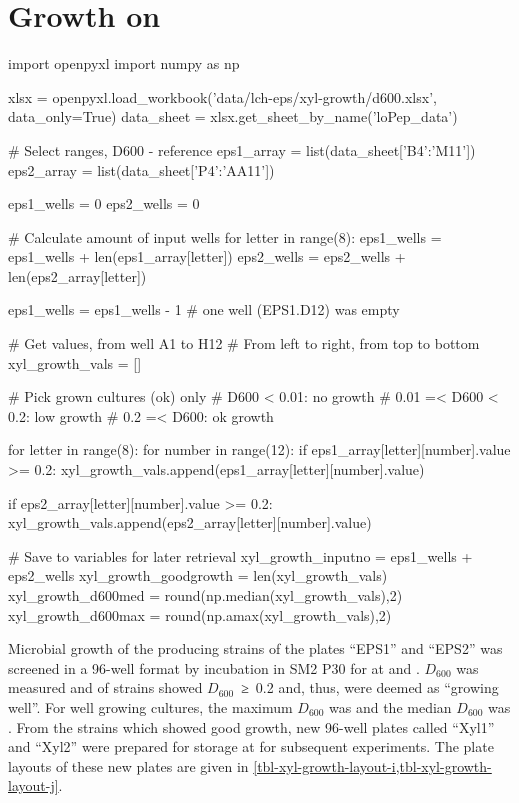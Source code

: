 \section{Growth on \XYL{}\label{sec-xyl-growth}}
\begin{pycode}
import openpyxl
import numpy as np

xlsx = openpyxl.load_workbook('data/lch-eps/xyl-growth/d600.xlsx', data_only=True)
data_sheet = xlsx.get_sheet_by_name('loPep_data')

# Select ranges, D600 - reference
eps1_array = list(data_sheet['B4':'M11'])
eps2_array = list(data_sheet['P4':'AA11'])

eps1_wells = 0
eps2_wells = 0

# Calculate amount of input wells
for letter in range(8):
    eps1_wells = eps1_wells + len(eps1_array[letter])
    eps2_wells = eps2_wells + len(eps2_array[letter])

eps1_wells = eps1_wells - 1  # one well (EPS1.D12) was empty

# Get values, from well A1 to H12
# From left to right, from top to bottom
xyl_growth_vals = []

# Pick grown cultures (ok) only
# D600 < 0.01:         no growth
# 0.01 =< D600 < 0.2: low growth
# 0.2 =< D600:         ok growth

for letter in range(8):
    for number in range(12):
        if eps1_array[letter][number].value >= 0.2:
            xyl_growth_vals.append(eps1_array[letter][number].value)

        if eps2_array[letter][number].value >= 0.2:
            xyl_growth_vals.append(eps2_array[letter][number].value)

# Save to variables for later retrieval
xyl_growth_inputno = eps1_wells + eps2_wells
xyl_growth_goodgrowth = len(xyl_growth_vals)
xyl_growth_d600med = round(np.median(xyl_growth_vals),2)
xyl_growth_d600max = round(np.amax(xyl_growth_vals),2)

\end{pycode}
Microbial growth of the \eps{} producing strains of the plates \enquote{EPS1} and \enquote{EPS2} was screened in a 96-well format by incubation in  SM2 P30 for  at  and . $D_{600}$ was measured and  of  strains showed $D_{600}$~≥~\num{0.2} and, thus, were deemed as \enquote{growing well}. For well growing cultures, the maximum $D_{600}$ was  and the median $D_{600}$ was . From the  strains which showed good growth, new 96-well plates called \enquote{Xyl1} and \enquote{Xyl2} were prepared for storage at  for subsequent experiments. The plate layouts of these new plates are given in \vref{tbl-xyl-growth-layout-i,tbl-xyl-growth-layout-j}.

